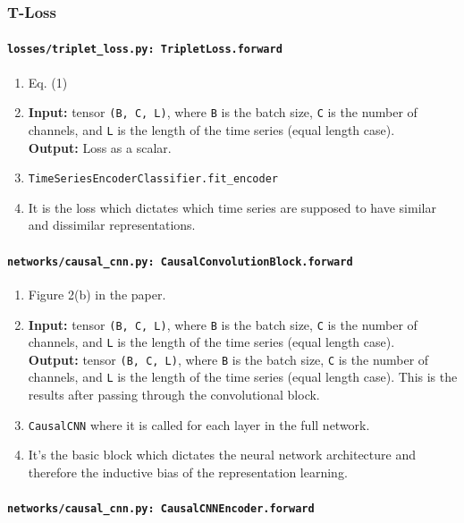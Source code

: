 \documentclass[a4paper,11pt]{article}
\newcommand{\code}[1]{\texttt{#1}}
\begin{document}
\subsubsection{T-Loss}

\paragraph{\code{losses/triplet\_loss.py: TripletLoss.forward}}
\begin{enumerate}[label=(\roman*)]
    \item Eq. (1)
    \item
    \textbf{Input:} tensor \texttt{(B, C, L)}, where \texttt{B} is the batch size, \texttt{C} is the number of channels, and \texttt{L} is the length of the time series (equal length case).\\
    \textbf{Output:} Loss as a scalar.
    \item \texttt{TimeSeriesEncoderClassifier.fit\_encoder}
    \item It is the loss which dictates which time series are supposed to have similar and dissimilar representations.
\end{enumerate}

\paragraph{\code{networks/causal\_cnn.py: CausalConvolutionBlock.forward}}
\begin{enumerate}[label=(\roman*)]
\item Figure 2(b) in the paper.
\item 
    \textbf{Input:} tensor \texttt{(B, C, L)}, where \texttt{B} is the batch size, \texttt{C} is the number of channels, and \texttt{L} is the length of the time series (equal length case).\\
    \textbf{Output:} tensor \texttt{(B, C, L)}, where \texttt{B} is the batch size, \texttt{C} is the number of channels, and \texttt{L} is the length of the time series (equal length case). This is the results after passing through the convolutional block.
\item \texttt{CausalCNN} where it is called for each layer in the full network.
\item It's the basic block which dictates the neural network architecture and therefore the inductive bias of the representation learning.
\end{enumerate}

\paragraph{\code{networks/causal\_cnn.py: CausalCNNEncoder.forward}}
\end{document}
